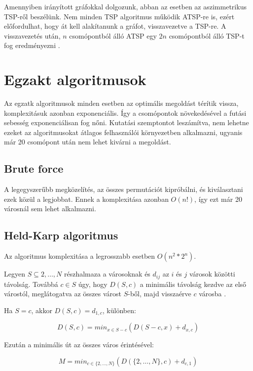 Amennyiben irányított gráfokkal dolgozunk, abban az esetben az aszimmetrikus TSP-ről beszélünk. Nem minden TSP algoritmus működik ATSP-re is, ezért előfordulhat, hogy át kell alakítanunk a gráfot, visszavezetve a TSP-re. A visszavezetés után, \(n\) csomópontból álló ATSP egy \(2n\) csomópontból álló TSP-t fog eredményezni \cite{atsp}.

\section{Egzakt algoritmusok}\label{sec:ALAP:adatelem}

Az egzatk algoritmusok minden esetben az optimális megoldást térítik vissza, komplexitásuk azonban exponenciális. Így a csomópontok növekedésével a futási sebesség exponenciálisan fog nőni. Kutatási szemptontot leszámítva, nem lehetne ezeket az algoritmusokat átlagos felhasználói környezetben alkalmazni, ugyanis már 20 csomópont után nem lehet kivárni a megoldást. 

\subsection{Brute force}

A legegyszerűbb megközelítés, az összes permutációt kipróbálni, és kiválasztani ezek közül a legjobbat. Ennek a komplexitása azonban \(O(n!)\), így ezt már 20 városnál sem lehet alkalmazni.


\subsection{Held-Karp algoritmus}

Az algoritmus komplexitása a legrosszabb esetben \(O(n^2*2^n)\).

Legyen \(S \subseteq {2, \dots, N}\) részhalmaza a városoknak és \(d_{ij}\) az \(i\) és \(j\) városok közötti távolság. Továbbá \(c \in S\) úgy, hogy \(D(S,c)\) a minimális távolság kezdve az első várostól, meglátogatva az összes várost \(S\)-ből, majd visszaérve \(c\) városba \cite{held}.

Ha \(S = {c}\), akkor \(D(S,c) = d_{1,c}\), különben:

\begin{equation}
D(S,c) = min_{x \in S-c}(D(S - c,x)+d_{x,c})
\end{equation}

Ezután a minimális út az összes város érintésével:

\begin{equation}
M = min_{c \in \{2, \dots, N\}}(D(\{2, \dots, N\}, c)+d_{c, 1})
\end{equation}

